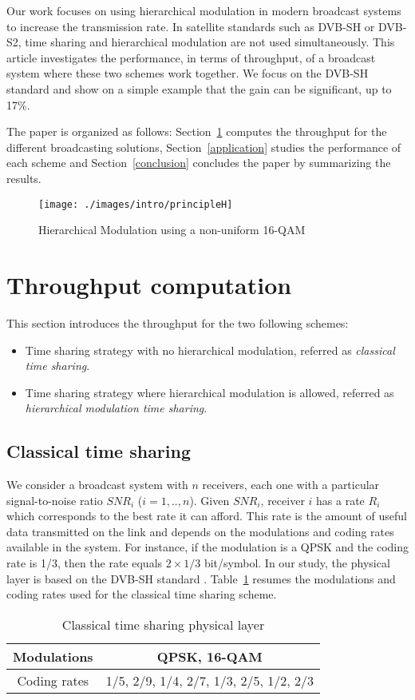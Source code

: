 \documentclass[conference, letterpaper]{IEEEtran}
\begin{document}
Our work focuses on using hierarchical modulation in modern broadcast systems to increase the transmission rate. In satellite standards such as DVB-SH or DVB-S2, time sharing and hierarchical modulation are not used simultaneously. This article investigates the performance, in terms of throughput, of a broadcast system where these two schemes work together. We focus on the DVB-SH standard and show on a simple example that the gain can be significant, up to 17\%. 
 
The paper is organized as follows: Section~\ref{achievable_rates} computes the throughput for the different broadcasting solutions, Section~\ref{application} studies the performance of each scheme and Section~\ref{conclusion} concludes the paper by summarizing the results.

\begin{figure}[!ht]
\centering
\texttt{[image: ./images/intro/principleH]}
\caption{Hierarchical Modulation using a non-uniform 16-QAM}
\label{hm_principle}
\end{figure}

 \section{Throughput computation}\label{achievable_rates}

This section introduces the throughput for the two following schemes:
\begin{itemize}
\item Time sharing strategy with no hierarchical modulation, referred as \emph{classical time sharing}.
\item Time sharing strategy where hierarchical modulation is allowed, referred as \emph{hierarchical modulation time sharing}.
\end{itemize}


\subsection{Classical time sharing}

We consider a broadcast system with $n$ receivers, each one with a particular signal-to-noise ratio $SNR_i$ ($i=1,..,n$). Given $SNR_i$, receiver $i$ has a rate $R_i$ which corresponds to the best rate it can afford. This rate is the amount of useful data transmitted on the link and depends on the modulations and coding rates available in the system. For instance, if the modulation is a QPSK and the coding rate is 1/3, then the rate equals $2 \times 1/3$ bit/symbol. In our study, the physical layer is based on the DVB-SH standard \cite{sh, DVBSH}. Table~\ref{cts} resumes the modulations and coding rates used for the classical time sharing scheme.
\begin{table}[!ht]
\renewcommand{\arraystretch}{1.1}
\caption{Classical time sharing physical layer}
\label{cts}
\centering
\begin{tabular}{c||c} 
\hline
Modulations & QPSK, 16-QAM \\ 
\hline
Coding rates & 1/5, 2/9, 1/4, 2/7, 1/3, 2/5, 1/2, 2/3\\
\hline 
\end{tabular}
\end{table}
\end{document}
